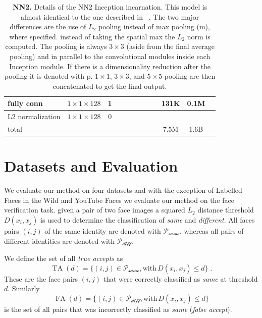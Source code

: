 \documentclass[10pt,twocolumn,letterpaper]{article}
\DeclareMathOperator{\fa}{FA}
\DeclareMathOperator{\ta}{TA}
\begin{document}
\begin{table}
\begin{center}
{\begin{tabular}[H]{|l|c|c|c|c|c|c|c|c|c|c|c|}
\hline
fully conn & $1{\times}1{\times}128$ & 1 & & & & & & & 131K & 0.1M \\
\hline
L2 normalization & $1{\times}1{\times}128$ & 0 & & & & & & & & \\
\hline
\hline
total & & & & & & & & & 7.5M & 1.6B \\
\hline
\end{tabular}
}
\end{center}
\caption{{\bf NN2.} Details of the NN2 Inception incarnation. This model is
  almost identical to the one described in ~\cite{SzegedyILSVRC2014}. The two
  major differences are the use of $L_2$ pooling instead of max pooling (m),
  where specified. \Ie instead of taking the spatial max the $L_2$ norm is
  computed. The pooling is always $3{\times}3$ (aside from the final average
  pooling) and in parallel to the convolutional modules inside each Inception
  module. If there is a dimensionality reduction after the pooling it is
denoted with p. $1{\times}1$, $3{\times}3$, and $5{\times}5$ pooling are then
concatenated to get the final output.}
\label{tab:nn2}
\end{table}


\section{Datasets and Evaluation}
\label{Datasets}

We evaluate our method on four datasets and with the exception of Labelled
Faces in the Wild and YouTube Faces we evaluate our method on the face
verification task. \Ie given a pair of two face images a squared $L_2$ distance
threshold $D(x_i,x_j)$ is used to determine the classification of \emph{same}
and \emph{different}. All faces pairs $(i,j)$ of the same identity are denoted
with $\mathcal{P_\text{same}}$, whereas all pairs of different identities are
denoted with $\mathcal{P_\text{diff}}$.

We define the set of all \emph{true accepts} as
\begin{equation}
  \ta(d)=\{(i,j)\in\mathcal{P_\text{same}},\text{with}\,D(x_i,x_j)\leq d\}\;.
\end{equation}
These are the face pairs $(i,j)$ that were correctly classified as \emph{same}
at threshold $d$. Similarly
\begin{equation}
  \fa(d)=\{(i,j)\in\mathcal{P_\text{diff}},\text{with}\,D(x_i,x_j)\leq d\}
\end{equation}
is the set of all pairs that was incorrectly classified as \emph{same}
(\emph{false accept}).
\end{document}
